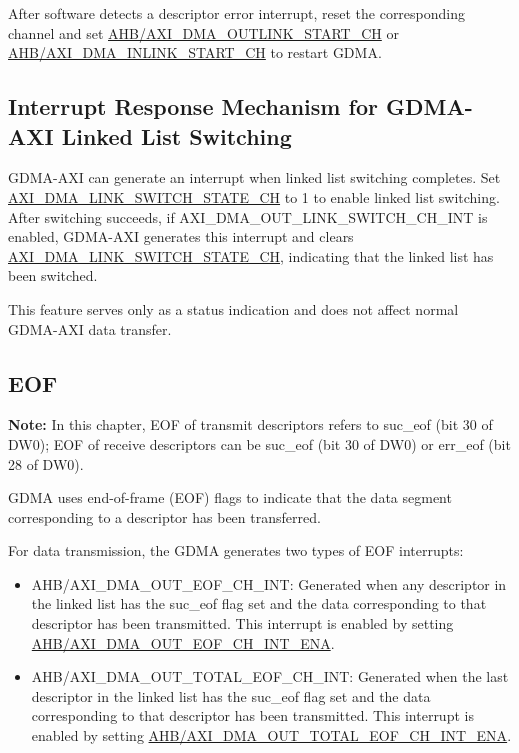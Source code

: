 \documentclass[main\_\_EN.tex]{subfiles}
\begin{document}
After software detects a descriptor error interrupt, reset the corresponding channel and set \hyperref[fielddesc:AHBDMAOUTLINKSTARTCHN]{AHB/AXI\_DMA\_OUTLINK\_START\_CH} or \hyperref[fielddesc:AHBDMAINLINKSTARTCHN]{AHB/AXI\_DMA\_INLINK\_START\_CH} to restart GDMA.


\subsection{Interrupt Response Mechanism for GDMA-AXI Linked List Switching}

GDMA-AXI can generate an interrupt when linked list switching completes. Set \hyperref[fielddesc:AXIDMALINKSWITCHSTATECHN]{AXI\_DMA\_LINK\_SWITCH\_STATE\_CH} to 1 to enable linked list switching. After switching succeeds, if AXI\_DMA\_OUT\_LINK\_SWITCH\_CH\_INT is enabled, GDMA-AXI generates this interrupt and clears \hyperref[fielddesc:AXIDMALINKSWITCHSTATECHN]{AXI\_DMA\_LINK\_SWITCH\_STATE\_CH}, indicating that the linked list has been switched.

This feature serves only as a status indication and does not affect normal GDMA-AXI data transfer.

\subsection{EOF}

{\bfseries Note:} In this chapter, EOF of transmit descriptors refers to suc\_eof (bit 30 of DW0); EOF of receive descriptors can be suc\_eof (bit 30 of DW0) or err\_eof (bit 28 of DW0).

GDMA uses end-of-frame (EOF) flags to indicate that the data segment corresponding to a descriptor has been transferred.

For data transmission, the GDMA generates two types of EOF interrupts:
\begin{itemize}
    \item AHB/AXI\_DMA\_OUT\_EOF\_CH\_INT: Generated when any descriptor in the linked list has the suc\_eof flag set and the data corresponding to that descriptor has been transmitted. This interrupt is enabled by setting \hyperref[fielddesc:AHBDMAOUTEOFCHNINTENA]{AHB/AXI\_DMA\_OUT\_EOF\_CH\_INT\_ENA}.
    \item AHB/AXI\_DMA\_OUT\_TOTAL\_EOF\_CH\_INT: Generated when the last descriptor in the linked list has the suc\_eof flag set and the data corresponding to that descriptor has been transmitted. This interrupt is enabled by setting \hyperref[fielddesc:AHBDMAOUTTOTALEOFCHNINTENA]{AHB/AXI\_DMA\_OUT\_TOTAL\_EOF\_CH\_INT\_ENA}.
\end{itemize}
\end{document}
